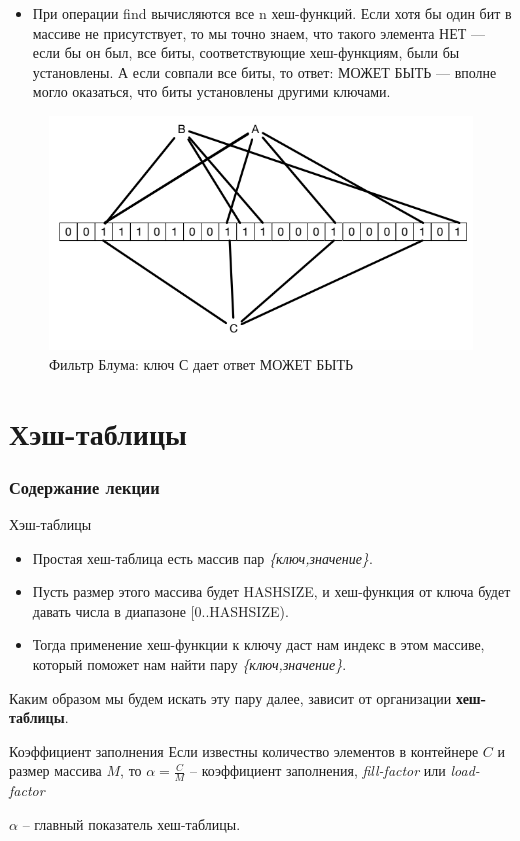 \documentclass{beamer}
\begin{document}
\begin{frame}
    \begin{itemize}
        \item При операции find вычисляются все n хеш-функций. Если хотя бы один бит в массиве не присутствует, то мы точно знаем, что такого элемента НЕТ — если бы он был, все биты, соответствующие хеш-функциям, были бы установлены. А если совпали все биты, то ответ: МОЖЕТ БЫТЬ — вполне могло оказаться, что биты установлены другими ключами.
    \end{itemize}
	\begin{figure}[h]
		\centering
		\includegraphics[scale=0.5]{images/lec08-pic11.png}
		\caption{Фильтр Блума: ключ С дает ответ МОЖЕТ БЫТЬ}
	\end{figure}
\end{frame}

\section{Хэш-таблицы}

\begin{frame}
  \frametitle{Содержание лекции}
  \tableofcontents[current]
\end{frame}

\begin{frame}{Хэш-таблицы}
    \begin{itemize}
        \item Простая хеш-таблица есть массив пар \textit{\{ключ,значение\}}.   \item Пусть размер этого массива будет HASHSIZE, и хеш-функция от ключа будет давать числа в диапазоне [0..HASHSIZE). 
        \item Тогда применение хеш-функции к ключу даст нам индекс в этом массиве, который поможет нам найти пару  \textit{\{ключ,значение\}}.
    \end{itemize}
    Каким образом мы будем искать эту пару далее, зависит от организации \textbf{хеш-таблицы}.
    
    \begin{block}{Коэффициент заполнения}
        Если известны количество элементов в контейнере $C$ и размер массива $M$, то $\alpha=\frac{C}{M}$ -- коэффициент заполнения, \textit{fill-factor} или \textit{load-factor} 
    \end{block}
    $\alpha$ -- главный показатель хеш-таблицы.
\end{frame}        
\end{document}
